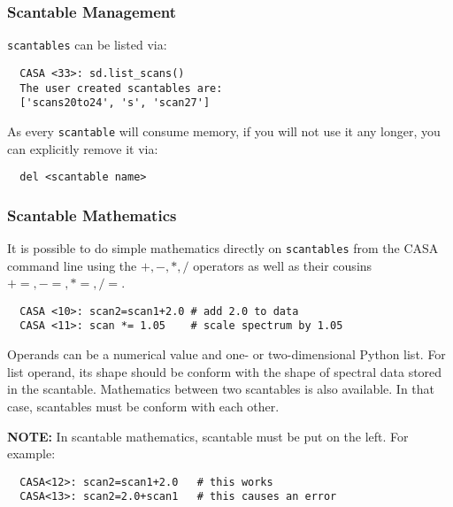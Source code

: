 \subsubsection{Scantable Management}
\label{subsubsection:sd.asap.scantable.management}

{\tt scantables} can be listed via:

\small
\begin{verbatim}
  CASA <33>: sd.list_scans()
  The user created scantables are:
  ['scans20to24', 's', 'scan27']
\end{verbatim}
\normalsize

As every {\tt scantable} will consume memory, if you will not use it
any longer, you can explicitly remove it via:

\small
\begin{verbatim}
  del <scantable name>
\end{verbatim}
\normalsize
 
\subsubsection{Scantable Mathematics}
\label{subsubsection:sd.asap.scantable.scanmath}

It is possible to do simple mathematics directly on {\tt scantables}
from the CASA command line using the $+,-,*,/$ operators as well as
their cousins $+=, -=, *=, /=$.  

\small
\begin{verbatim}
  CASA <10>: scan2=scan1+2.0 # add 2.0 to data 
  CASA <11>: scan *= 1.05    # scale spectrum by 1.05 
\end{verbatim}
\normalsize

Operands can be
a numerical value and one- or two-dimensional Python list. For list
operand, its shape should be conform with the shape of spectral data stored in the scantable.
Mathematics between two scantables is also available. In that case,
scantables must be conform with each other.

{\bf NOTE:} In scantable mathematics, scantable must be put on the left.
For example:
\begin{verbatim}
  CASA<12>: scan2=scan1+2.0   # this works
  CASA<13>: scan2=2.0+scan1   # this causes an error
\end{verbatim}


